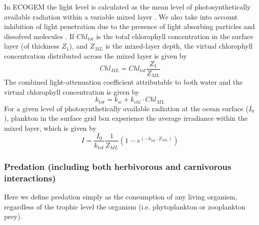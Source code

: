 \documentclass[gmd, manuscript]{copernicus}
\providecommand{\DIFadd}[1]{{\protect\color{blue}\uwave{#1}}} %
\providecommand{\DIFaddbegin}{} %
\providecommand{\DIFaddend}{} %
\begin{document}
In ECOGEM the light level is  calculated as the mean level of photosynthetically available radiation within a variable mixed layer \citep[with depth calculated according to][]{Kraus:1967b}. We also take into account inhibition of light penetration due to the presence of light absorbing particles and dissolved molecules \citep{Shigsesada:1981}. If $Chl_{tot}$ is the total chlorophyll concentration in the surface layer (of thickness $Z_1$), and $Z_{ML}$ is the mixed-layer depth, the virtual chlorophyll concentration distributed across the mixed layer is given by
%
\begin{equation}
Chl_{ML} = Chl_{tot} \frac{Z_1}{Z_{ML}}
\end{equation}
%
The combined light-attenuation coefficient attributable to both water and the virtual chlorophyll concentration is given by
%
\begin{equation}
 k_{tot} = k_w + k_{chl} \cdot Chl_{ML}
\end{equation}
%
For a given level of photosynthetically available radiation at the ocean surface ($I_0$), plankton in the surface grid box experience the average irradiance within the mixed layer, which is given by
%
\begin{equation}
I = \frac{I_0}{k_{tot}} \frac{1}{Z_{ML}} (1-e^{(-k_{tot}\cdot Z_{ML})})
\end{equation}
%

\subsubsection{Predation (including both herbivorous and carnivorous interactions)}

Here we define predation simply as the consumption of any living organism, regardless of the trophic level \DIFaddbegin \DIFadd{of }\DIFaddend the organism (i.e. phytoplankton or zooplankton prey).
\end{document}
